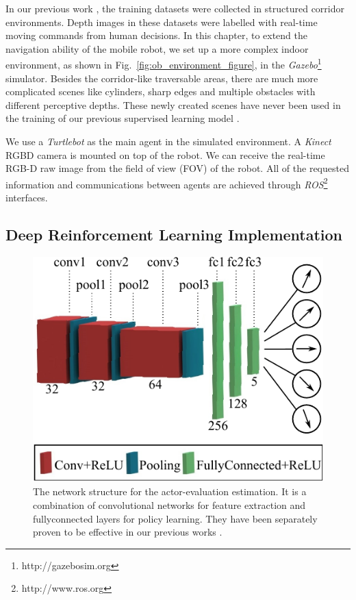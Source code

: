 In our previous work \cite{tai2016deep}, the training datasets were collected in structured corridor environments. Depth images in these datasets were labelled with real-time moving commands from human decisions. In this chapter, to extend the navigation ability of the mobile robot, we set up a more complex indoor environment, as shown in Fig.~\ref{fig:ob_environment_figure}, in the \textit{Gazebo}\footnote{http://gazebosim.org} simulator. Besides the corridor-like traversable areas, there are much more complicated scenes like cylinders, sharp edges and multiple obstacles with different perceptive depths. These newly created scenes have never been used in the training of our previous supervised learning model \cite{tai2016deep}.

We use a \textit{Turtlebot} as the main agent in the simulated environment. A \textit{Kinect} RGBD camera is mounted on top of the robot. We can receive the real-time RGB-D raw image from the field of view (FOV) of the robot. All of the requested information and communications between agents are achieved through \textit{ROS}\footnote{http://www.ros.org} interfaces.



\subsection{Deep Reinforcement Learning Implementation}
   \begin{figure}[!t]
      \centering
      \includegraphics[width=0.75\columnwidth]{figure/obstacle_figs/cnn_structure}
      \caption{The network structure for the actor-evaluation estimation. It is a combination of convolutional networks for feature extraction and fullyconnected layers for policy learning. They have been separately proven to be effective in our previous works \cite{tai2016deep, tl_rcar_2016}.}
      \label{fig:ob_network_structure}
   \end{figure}

